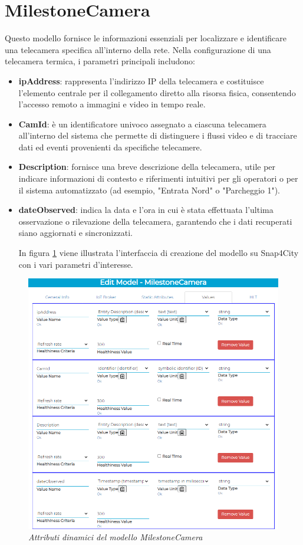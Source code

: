 \documentclass[a4paper, openright, thesis]{report}
\begin{document}
\section{MilestoneCamera}
Questo modello fornisce le informazioni essenziali per localizzare e identificare una telecamera specifica all’interno della rete.
Nella configurazione di una telecamera termica, i parametri principali includono:
\begin{itemize}
\item\textbf{ipAddress}: rappresenta l'indirizzo IP della telecamera e costituisce l'elemento centrale per il collegamento diretto alla risorsa fisica, consentendo l'accesso remoto a immagini e video in tempo reale.

\item\textbf{CamId}: è un identificatore univoco assegnato a ciascuna telecamera all’interno del sistema che permette di distinguere i flussi video e di tracciare dati ed eventi provenienti da specifiche telecamere.

\item\textbf{Description}: fornisce una breve descrizione della telecamera, utile per indicare informazioni di contesto e riferimenti intuitivi per gli operatori o per il sistema automatizzato (ad esempio, "Entrata Nord" o "Parcheggio 1").

\item\textbf{dateObserved}: indica la data e l’ora in cui è stata effettuata l’ultima osservazione o rilevazione della telecamera, garantendo che i dati recuperati siano aggiornati e sincronizzati.

In figura \ref{9} viene illustrata l'interfaccia di creazione del modello su Snap4City con i vari parametri d'interesse.

\end{itemize}
\begin{figure}[H]
    \centering
    \includegraphics[width=1\linewidth]{img/CamModel3.png}
    \caption{\textit{ Attributi dinamici del modello MilestoneCamera}}
    \label{9}
\end{figure}
\end{document}

